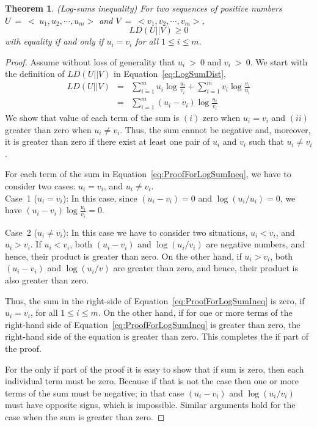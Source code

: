 \documentclass[10pt,myheadings]{IEEEtran}
\newtheorem{theorem}{Theorem}
\begin{document}
	\begin{theorem} (\emph{Log-sums inequality})
	\label{LogSumInequality}
	For two sequences of positive numbers $U~=~<~u_1,u_2,\cdots,u_m>$ and $V~=~<v_1,v_2,\cdots,v_m> $,
	\begin{equation}
	LD(U||V) \geq 0
	\label{eq:logSumIneq}
	\end{equation}
	with equality if and only if $u_i = v_i$ for all $1\leq i \leq m$.
	\end{theorem}

\begin{proof} Assume without loss of generality that $u_i~>~0$ and $v_i~>~0$.  We start with the 
 definition of $LD(U||V)$ in Equation~\ref{eq:LogSumDist}, 
\begin{eqnarray}
LD(U||V) &=&\sum_{i=1}^m u_i\log\frac{u_i}{v_i} + \sum_{i=1}^m v_i\log\frac{v_i}{u_i} \nonumber \\ 
&=& \sum_{i=1}^m (u_i- v_i)\log\frac{u_i}{v_i}  
\label{eq:ProofForLogSumIneq}
\end{eqnarray}
We show that value of each term  of the sum is
 $(i)$ zero when $u_i =v_i$ and $(ii)$ greater than zero when $u_i \neq v_i$. Thus, the sum cannot be negative and,
 moreover, it is greater than zero if there exist at least one pair of $u_i$ and $v_i$ such that $u_i \neq v_i$.

For each term of the sum in Equation~\ref{eq:ProofForLogSumIneq}, we have to consider two cases: $u_i=v_i$, and $u_i\ne v_i$.\\
Case~1 ($u_i = v_i$): In this case, since $(u_i-v_i) = 0$ and  $\log(u_i/u_i) = 0$, we have $(u_i- v_i)\log\frac{u_i}{v_i} = 0$. 
\par
\noindent
Case~2 ($u_i\ne v_i$): In this case we have to consider two situations, $u_i < v_i$, and $u_i > v_i$. 
If $u_i < v_i$,  both $(u_i-v_i)$ and $\log(u_i/v_i)$ are negative numbers, and hence, their product is greater than zero. On the other hand, if $u_i > v_i$,  both $(u_i-v_i)$ and $\log(u_i/v)$ are greater than zero, and hence, their product is also greater than zero.
\par
Thus, the sum in the right-side of Equation~\ref{eq:ProofForLogSumIneq} is zero, if $u_i = v_i$, for all $1\leq i \leq m$. On the other hand, if for one or more terms of the right-hand side of  Equation~\ref{eq:ProofForLogSumIneq} is  greater than zero, the right-hand side of the equation is greater than zero. This completes the if part of the proof.
\par
For the only if part of the proof it is easy to show that if sum is zero, then each individual term must be zero. Because if that is not the case then one or more terms of the sum must be negative; in that case $(u_i-v_i)$ and $\log(u_i/v_i)$ must have opposite signs, which is impossible. Similar arguments hold for the case when the sum is greater than zero.
\end{proof}
\end{document}

